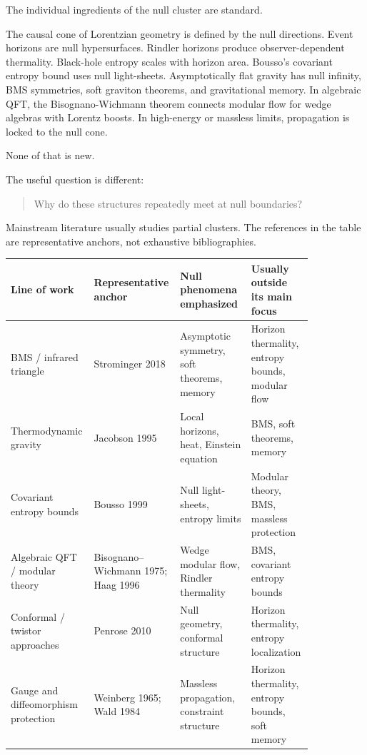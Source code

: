 \documentclass[12pt,a4paper]{article}
\theoremstyle{definition}
\theoremstyle{remark}
\begin{document}
The individual ingredients of the null cluster are standard.

The causal cone of Lorentzian geometry is defined by the null
directions. Event horizons are null hypersurfaces. Rindler horizons
produce observer-dependent thermality. Black-hole entropy scales with
horizon area. Bousso's covariant entropy bound uses null light-sheets.
Asymptotically flat gravity has null infinity, BMS symmetries, soft
graviton theorems, and gravitational memory. In algebraic QFT, the
Bisognano-Wichmann theorem connects modular flow for wedge algebras with
Lorentz boosts. In high-energy or massless limits, propagation is locked
to the null cone.

None of that is new.

The useful question is different:

\begin{quote}
Why do these structures repeatedly meet at null boundaries?
\end{quote}

Mainstream literature usually studies partial clusters. The references
in the table are representative anchors, not exhaustive bibliographies.

\begin{center}
\begin{tabular}{P{0.21\linewidth}P{0.20\linewidth}P{0.23\linewidth}P{0.20\linewidth}}
\toprule
\textbf{Line of work} & \textbf{Representative anchor} & \textbf{Null phenomena emphasized} & \textbf{Usually outside its main focus} \\
\midrule
BMS / infrared triangle & Strominger 2018 & Asymptotic symmetry, soft theorems, memory & Horizon thermality, entropy bounds, modular flow \\
Thermodynamic gravity & Jacobson 1995 & Local horizons, heat, Einstein equation & BMS, soft theorems, memory \\
Covariant entropy bounds & Bousso 1999 & Null light-sheets, entropy limits & Modular theory, BMS, massless protection \\
Algebraic QFT / modular theory & Bisognano--Wichmann 1975; Haag 1996 & Wedge modular flow, Rindler thermality & BMS, covariant entropy bounds \\
Conformal / twistor approaches & Penrose 2010 & Null geometry, conformal structure & Horizon thermality, entropy localization \\
Gauge and diffeomorphism protection & Weinberg 1965; Wald 1984 & Massless propagation, constraint structure & Horizon thermality, entropy bounds, soft memory \\
\bottomrule
\end{tabular}
\end{center}
\end{document}
